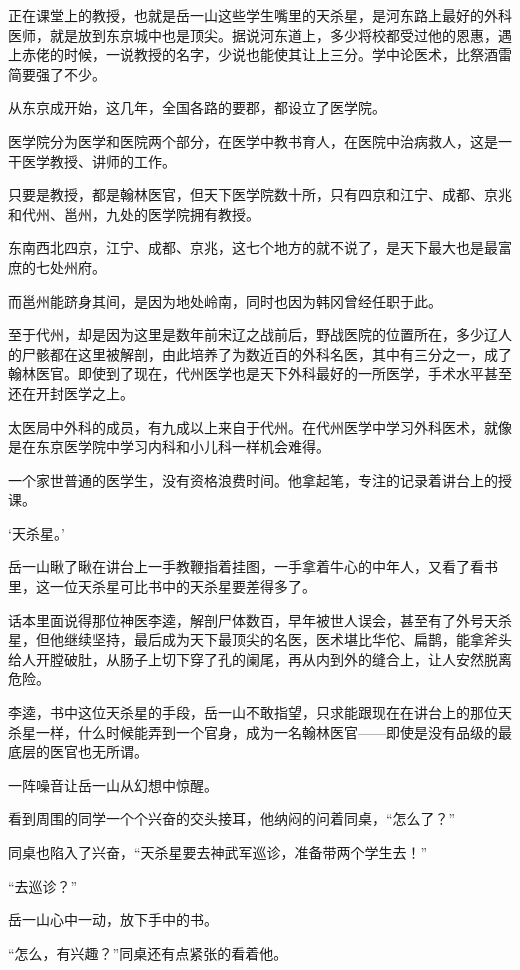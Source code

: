 正在课堂上的教授，也就是岳一山这些学生嘴里的天杀星，是河东路上最好的外科医师，就是放到东京城中也是顶尖。据说河东道上，多少将校都受过他的恩惠，遇上赤佬的时候，一说教授的名字，少说也能使其让上三分。学中论医术，比祭酒雷简要强了不少。

从东京成开始，这几年，全国各路的要郡，都设立了医学院。

医学院分为医学和医院两个部分，在医学中教书育人，在医院中治病救人，这是一干医学教授、讲师的工作。

只要是教授，都是翰林医官，但天下医学院数十所，只有四京和江宁、成都、京兆和代州、邕州，九处的医学院拥有教授。

东南西北四京，江宁、成都、京兆，这七个地方的就不说了，是天下最大也是最富庶的七处州府。

而邕州能跻身其间，是因为地处岭南，同时也因为韩冈曾经任职于此。

至于代州，却是因为这里是数年前宋辽之战前后，野战医院的位置所在，多少辽人的尸骸都在这里被解剖，由此培养了为数近百的外科名医，其中有三分之一，成了翰林医官。即使到了现在，代州医学也是天下外科最好的一所医学，手术水平甚至还在开封医学之上。

太医局中外科的成员，有九成以上来自于代州。在代州医学中学习外科医术，就像是在东京医学院中学习内科和小儿科一样机会难得。

一个家世普通的医学生，没有资格浪费时间。他拿起笔，专注的记录着讲台上的授课。

‘天杀星。’

岳一山瞅了瞅在讲台上一手教鞭指着挂图，一手拿着牛心的中年人，又看了看书里，这一位天杀星可比书中的天杀星要差得多了。

话本里面说得那位神医李逵，解剖尸体数百，早年被世人误会，甚至有了外号天杀星，但他继续坚持，最后成为天下最顶尖的名医，医术堪比华佗、扁鹊，能拿斧头给人开膛破肚，从肠子上切下穿了孔的阑尾，再从内到外的缝合上，让人安然脱离危险。

李逵，书中这位天杀星的手段，岳一山不敢指望，只求能跟现在在讲台上的那位天杀星一样，什么时候能弄到一个官身，成为一名翰林医官——即使是没有品级的最底层的医官也无所谓。

一阵噪音让岳一山从幻想中惊醒。

看到周围的同学一个个兴奋的交头接耳，他纳闷的问着同桌，“怎么了？”

同桌也陷入了兴奋，“天杀星要去神武军巡诊，准备带两个学生去！”

“去巡诊？”

岳一山心中一动，放下手中的书。

“怎么，有兴趣？”同桌还有点紧张的看着他。

